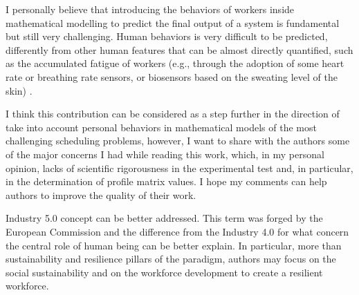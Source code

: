 \documentclass[preprint,11pt,3p]{elsarticle}
\begin{document}
I personally believe that introducing the behaviors of workers inside mathematical modelling to predict the final output of a system is fundamental but still very challenging. Human behaviors is very difficult to be predicted, differently from other human features that can be almost directly quantified, such as the accumulated fatigue of workers (e.g., through the adoption of some heart rate or breathing rate sensors, or biosensors based on the sweating level of the skin) .

I think this contribution can be considered as a step further in the direction of take into account personal behaviors in mathematical models of the most challenging scheduling problems, however, I want to share with the authors some of the major concerns I had while reading this work, which, in my personal opinion, lacks of scientific rigorousness in the experimental test and, in particular, in the determination of profile matrix values. I hope my comments can help authors to improve the quality of their work.

\begin{tcolorbox}[colback=q_color1,colframe=q_color2,title=Q1 :]	
	Industry 5.0 concept can be better addressed. This term was forged by the European Commission and the difference from the Industry 4.0 for what concern the central role of human being can be better explain. In particular, more than sustainability and resilience pillars of the paradigm, authors may focus on the social sustainability and on the workforce development to create a resilient workforce.
\end{tcolorbox}
   
\end{document}
